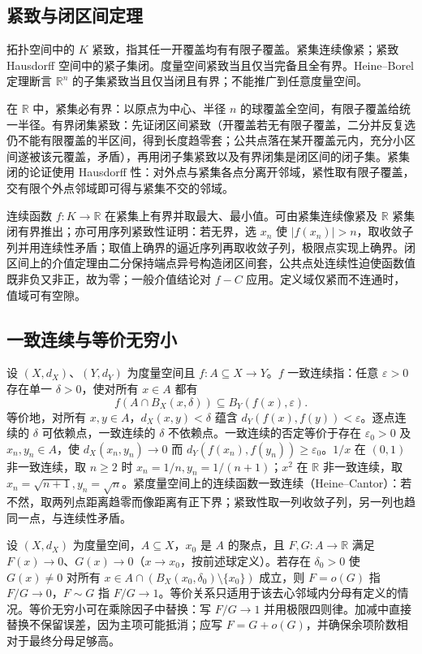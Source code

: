 \documentclass[11pt,a4paper,UTF8]{ctexart}
\theoremstyle{definition}\newtheorem{definition}[theorem]{定义}
\theoremstyle{remark}\newtheorem{remark}[theorem]{说明}
\begin{document}
\subsection{紧致与闭区间定理}
拓扑空间中的 $K$ 紧致，指其任一开覆盖均有有限子覆盖。紧集连续像紧；紧致 Hausdorff 空间中的紧子集闭。度量空间紧致当且仅当完备且全有界。Heine--Borel 定理断言 $\mathbb R^n$ 的子集紧致当且仅当闭且有界；不能推广到任意度量空间。

在 $\mathbb R$ 中，紧集必有界：以原点为中心、半径 $n$ 的球覆盖全空间，有限子覆盖给统一半径。有界闭集紧致：先证闭区间紧致（开覆盖若无有限子覆盖，二分并反复选仍不能有限覆盖的半区间，得到长度趋零套；公共点落在某开覆盖元内，充分小区间遂被该元覆盖，矛盾），再用闭子集紧致以及有界闭集是闭区间的闭子集。紧集闭的论证使用 Hausdorff 性：对外点与紧集各点分离开邻域，紧性取有限子覆盖，交有限个外点邻域即可得与紧集不交的邻域。

连续函数 $f:K\to\mathbb R$ 在紧集上有界并取最大、最小值。可由紧集连续像紧及 $\mathbb R$ 紧集闭有界推出；亦可用序列紧致性证明：若无界，选 $x_n$ 使 $|f(x_n)|>n$，取收敛子列并用连续性矛盾；取值上确界的逼近序列再取收敛子列，极限点实现上确界。闭区间上的介值定理由二分保持端点异号构造闭区间套，公共点处连续性迫使函数值既非负又非正，故为零；一般介值结论对 $f-C$ 应用。定义域仅紧而不连通时，值域可有空隙。

\subsection{一致连续与等价无穷小}
设 $(X,d_X)$、$(Y,d_Y)$ 为度量空间且 $f:A\subseteq X\to Y$。$f$ 一致连续指：任意 $\varepsilon>0$ 存在单一 $\delta>0$，使对所有 $x\in A$ 都有
\[
f(A\cap B_X(x,\delta))\subseteq B_Y(f(x),\varepsilon).
\]
等价地，对所有 $x,y\in A$，$d_X(x,y)<\delta$ 蕴含 $d_Y(f(x),f(y))<\varepsilon$。逐点连续的 $\delta$ 可依赖点，一致连续的 $\delta$ 不依赖点。一致连续的否定等价于存在 $\varepsilon_0>0$ 及 $x_n,y_n\in A$，使 $d_X(x_n,y_n)\to0$ 而 $d_Y(f(x_n),f(y_n))\ge\varepsilon_0$。$1/x$ 在 $(0,1)$ 非一致连续，取 $n\ge2$ 时 $x_n=1/n,y_n=1/(n+1)$；$x^2$ 在 $\mathbb R$ 非一致连续，取 $x_n=\sqrt{n+1},y_n=\sqrt n$。紧度量空间上的连续函数一致连续（Heine--Cantor）：若不然，取两列点距离趋零而像距离有正下界；紧致性取一列收敛子列，另一列也趋同一点，与连续性矛盾。

设 $(X,d_X)$ 为度量空间，$A\subseteq X$，$x_0$ 是 $A$ 的聚点，且 $F,G:A\to\mathbb R$ 满足 $F(x)\to0$、$G(x)\to0$（$x\to x_0$，按前述球定义）。若存在 $\delta_0>0$ 使 $G(x)\ne0$ 对所有 $x\in A\cap(B_X(x_0,\delta_0)\setminus\{x_0\})$ 成立，则 $F=o(G)$ 指 $F/G\to0$，$F\sim G$ 指 $F/G\to1$。等价关系只适用于该去心邻域内分母有定义的情况。等价无穷小可在乘除因子中替换：写 $F/G\to1$ 并用极限四则律。加减中直接替换不保留误差，因为主项可能抵消；应写 $F=G+o(G)$，并确保余项阶数相对于最终分母足够高。
\end{document}
